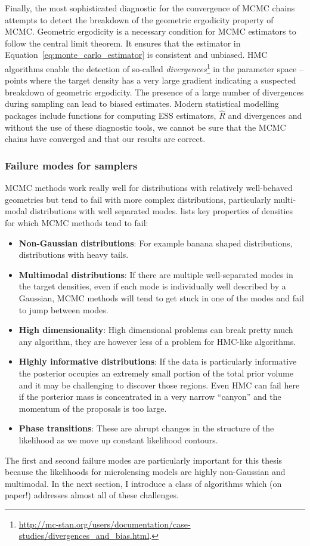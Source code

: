 \documentclass[12pt,dvipsnames]{report}
\begin{document}
Finally, the most sophisticated diagnostic for the convergence of MCMC chains
attempts to detect the breakdown of the geometric ergodicity property of
MCMC. Geometric ergodicity is a necessary condition for MCMC estimators to
follow the central limit theorem.
It ensures that the estimator in 
Equation~\ref{eq:monte_carlo_estimator} is consistent and unbiased.
HMC algorithms enable the detection of so-called
\emph{divergences}\footnote{\url{http://mc-stan.org/users/documentation/case-studies/divergences_and_bias.html}.}
 in the parameter space -- points 
where the target density has a very large gradient indicating 
a suspected  breakdown of geometric ergodicity.
The presence of a large number of divergences during sampling can lead to 
biased estimates. 
Modern statistical modelling packages include functions for computing ESS 
estimators,  $\hat R$ and divergences and without the use of these diagnostic 
tools, we cannot be sure that the MCMC chains have converged and that our results 
are correct.



\subsubsection{Failure modes for samplers}
MCMC methods work really well for distributions with relatively well-behaved 
geometries but tend to fail with more complex distributions, particularly 
multi-modal distributions with well separated modes. 
 \citet{arXiv:2101.09675} lists 
key properties of densities for which MCMC methods tend to fail:
\begin{itemize}
    \item \textbf{Non-Gaussian distributions}: For example banana shaped
    distributions, distributions with heavy tails.
    \item \textbf{Multimodal distributions}: If there are multiple well-separated
    modes in the target densities, even if each mode is individually 
    well described by a Gaussian, MCMC methods will tend to get stuck in one of
    the modes and fail to jump between modes.
    \item \textbf{High dimensionality}: High dimensional problems can break pretty 
    much any algorithm, they are however less of a problem for HMC-like algorithms.
    \item \textbf{Highly informative distributions}: If the data is particularly 
    informative the posterior occupies an extremely small portion of the total 
    prior volume and it may be challenging to discover those regions. Even HMC 
    can fail here if the posterior mass is concentrated  in a very narrow 
    ``canyon'' and the momentum of the proposals is too large.
    \item \textbf{Phase transitions}: These are abrupt changes in the structure 
    of the likelihood as we move up constant likelihood contours.
\end{itemize}
The first and second failure modes are particularly important for this thesis 
because the likelihoods for microlensing models are highly non-Gaussian and 
multimodal. In the next section, I introduce a class of algorithms which (on paper!)
addresses almost all of these challenges.
\end{document}
